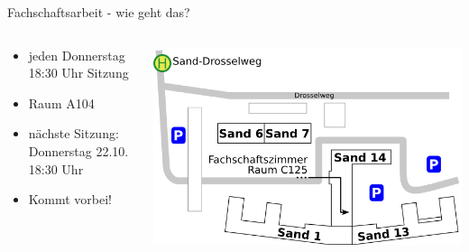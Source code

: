 \documentclass{beamer}
\begin{document}
	\begin{frame}{Fachschaftsarbeit - wie geht das?}
		\begin{columns}
			\begin{column}{.5\linewidth}
				\begin{itemize}
					\item jeden Donnerstag 18:30 Uhr Sitzung
					\item Raum A104
					\item nächste Sitzung: \\Donnerstag 22.10. 18:30 Uhr
					\item Kommt vorbei!
				\end{itemize}
			\end{column}
			\begin{column}{0.5\linewidth}
				\includegraphics[width=\linewidth]{Lageplan.png}\\

\end{column}
\end{columns}
\end{frame}
\end{document}
